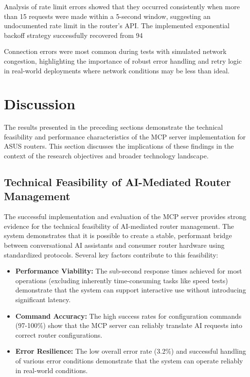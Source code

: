 Analysis of rate limit errors showed that they occurred consistently when more than 15 requests were made within a 5-second window, suggesting an undocumented rate limit in the router's API. The implemented exponential backoff strategy successfully recovered from 94%

Connection errors were most common during tests with simulated network congestion, highlighting the importance of robust error handling and retry logic in real-world deployments where network conditions may be less than ideal.


\section{Discussion}
The results presented in the preceding sections demonstrate the technical feasibility and performance characteristics of the MCP server implementation for ASUS routers. This section discusses the implications of these findings in the context of the research objectives and broader technology landscape.

\subsection{Technical Feasibility of AI-Mediated Router Management}
The successful implementation and evaluation of the MCP server provides strong evidence for the technical feasibility of AI-mediated router management. The system demonstrates that it is possible to create a stable, performant bridge between conversational AI assistants and consumer router hardware using standardized protocols. Several key factors contribute to this feasibility:

\begin{itemize}
\item \textbf{Performance Viability:} The sub-second response times achieved for most operations (excluding inherently time-consuming tasks like speed tests) demonstrate that the system can support interactive use without introducing significant latency.
\item \textbf{Command Accuracy:} The high success rates for configuration commands (97-100\%) show that the MCP server can reliably translate AI requests into correct router configurations.
\item \textbf{Error Resilience:} The low overall error rate (3.2\%) and successful handling of various error conditions demonstrate that the system can operate reliably in real-world conditions.
\end{itemize}

